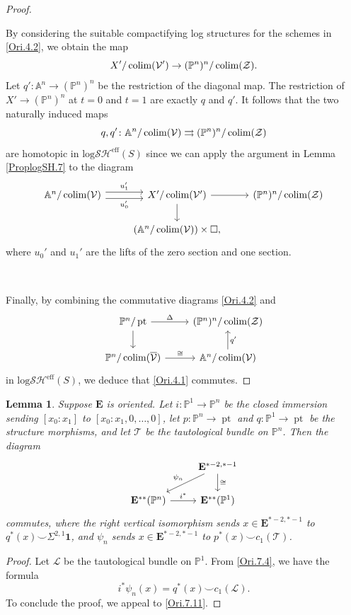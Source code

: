 \documentclass[11pt, a4paper]{amsart}
\newtheorem{lem}[thm]{Lemma}
\theoremstyle{definition}
\numberwithin{equation}{subsection}
\renewcommand{\P}{\mathbb{P}}
\newcommand{\A}{\mathbb{A}}
\newcommand{\pt}[1]{\mathrm{\pt}_{#1}}
\newcommand{\colimit}{\mathop{\rm colim}}
\newcommand{\ol}{\overline}
\newcommand{\cL}{\mathcal{L}}
\newcommand{\cT}{\mathcal{T}}
\newcommand{\cV}{\mathcal{V}}
\newcommand{\cZ}{\mathcal{Z}}
\newcommand{\boxx}{\square}
\def\pt{\operatorname{pt}}
\newcommand{\unit}{\mathbf{1}}
\newcommand{\ringE}{\mathbf{E}}
\newcommand{\inflogSHS}{\mathrm{log}\mathcal{SH}^{\mathrm{eff}}}
\begin{document}
\begin{proof}
\

By considering the suitable compactifying log structures for the schemes in \eqref{Ori.4.2}, we obtain the map
\[
X'/\colimit(\cV')\to (\P^n)^n/\colimit(\cZ).
\]
Let $q'\colon \A^n\to (\P^n)^n$ be the restriction of the diagonal map.
The restriction of $X'\to (\P^n)^n$ at $t=0$ and $t=1$ are exactly $q$ and $q'$.
It follows that the two naturally induced maps
\[
q,q'\colon \A^n/\colimit(\cV)\rightrightarrows (\P^n)^n/\colimit(\cZ)
\]
are homotopic in $\inflogSHS(S)$ since we can apply the argument in Lemma \ref{ProplogSH.7} to the diagram
\[
\begin{tikzcd}
\A^n/\colimit(\cV)\ar[r,shift left=0.75ex,"u_1'"]\ar[r,shift right=0.75ex,"u_0'"']&
X'/\colimit(\cV')\ar[r]\ar[d]&
(\P^n)^n/\colimit(\cZ)
\\
&
(\A^n/\colimit(\cV))\times \boxx,
\end{tikzcd}
\]
where $u_0'$ and $u_1'$ are the lifts of the zero section and one section.

\

Finally, 
by combining the commutative diagrams \eqref{Ori.4.2} and 
\[
\begin{tikzcd}
\P^n/\pt\ar[r,"\Delta"]\ar[d]&
(\P^n)^n/\colimit(\cZ)\ar[d,"q'",leftarrow]
\\
\P^n/\colimit(\ol{\cV})\ar[r,"\cong"]&
\A^n/\colimit(\cV)
\end{tikzcd}
\]
in $\inflogSHS(S)$, we deduce that \eqref{Ori.4.1} commutes.
\end{proof}


\begin{lem}
\label{Ori.58}
Suppose $\ringE$ is oriented.
Let $i\colon \P^1\to \P^n$ be the closed immersion sending $[x_0:x_1]$ to $[x_0:x_1,0,\ldots,0]$, let $p\colon \P^n\to \pt$ and $q\colon \P^1\to \pt$ be the structure morphisms, and let $\cT$ be the tautological bundle on $\P^n$.
Then the diagram
\[
\begin{tikzcd}
&
\ringE^{*-2,*-1}\ar[d,"\cong"]\ar[ld,"\psi_n"']
\\
\ringE^{**}(\P^n)\ar[r,"i^*"]&
\ringE^{**}(\P^1)
\end{tikzcd}
\]
commutes, where the right vertical isomorphism sends $x\in \ringE^{*-2,*-1}$ to $q^*(x)\smile \Sigma^{2,1}\unit$, and $\psi_n$ sends $x\in \ringE^{*-2,*-1}$ to $p^*(x) \smile c_1(\cT)$.
\end{lem}
\begin{proof}
Let $\cL$ be the tautological bundle on $\P^1$.
From \eqref{Ori.7.4}, we have the formula
\[
i^* \psi_n(x)
=
q^*(x) \smile c_1(\cL).
\]
To conclude the proof, we appeal to \eqref{Ori.7.11}.
\end{proof}
\end{document}
